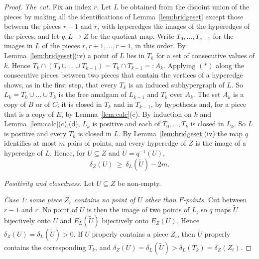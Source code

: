\documentclass[11pt,a4paper]{article}
\theoremstyle{definition}
\begin{document}
\begin{proof}
\emph{The cut.} Fix an index $r$. Let $L$ be obtained from the disjoint union
of the pieces by making all the identifications of Lemma~\ref{lem:bridgeset}
except those between the pieces $r-1$ and $r$, with hyperedges the images of
the hyperedges of the pieces, and let $q\colon L\to Z$ be the quotient map.
Write $T_0,\dots,T_{s-1}$ for the images in $L$ of the pieces
$r,r+1,\dots,r-1$, in this order. By Lemma~\ref{lem:bridgeset}(iv) a point of
$L$ lies in $T_k$ for a set of consecutive values of $k$. Hence
$T_k\cap(T_0\cup\dots\cup T_{k-1})=T_k\cap T_{k-1}=:A_k$. Applying $(\ast)$ along
the consecutive pieces between two pieces that contain the vertices of a
hyperedge shows, as in the first step, that every $T_k$ is an induced
subhypergraph of $L$. So $L_k=T_0\cup\dots\cup T_k$ is the free amalgam of
$L_{k-1}$ and $T_k$ over $A_k$. The set $A_k$ is a copy of $B$ or of $C$; it is closed in $T_k$ and in
$T_{k-1}$, by hypothesis and, for a piece that is a copy of $E$, by
Lemma~\ref{lem:calc}(c). By induction on $k$ and Lemma~\ref{lem:calc}(c),(d),
$L_k$ is positive and each of $T_0,\dots,T_k$ is closed in $L_k$. So $L$ is
positive and every $T_k$ is closed in $L$. By Lemma~\ref{lem:bridgeset}(iv) the
map $q$ identifies at most $m$ pairs of points, and every hyperedge of $Z$ is
the image of a hyperedge of $L$. Hence, for $U\subseteq Z$ and $\widetilde U=q^{-1}(U)$,
\begin{equation}\label{eq:cutloss}
 \delta_Z(U)\ \ge\ \delta_L(\widetilde U)-2m .
\end{equation}

\emph{Positivity and closedness.} Let $U\subseteq Z$ be non-empty.

\emph{Case 1: some piece $Z_r$ contains no point of $U$ other than
$F$-points.} Cut between $r-1$ and $r$. No point of $U$ is then the image of
two points of $L$, so $q$ maps $\widetilde U$ bijectively onto $U$ and
$E_L(\widetilde U)$ bijectively onto $E_Z(U)$. Hence
$\delta_Z(U)=\delta_L(\widetilde U)>0$. If $U$ properly contains a piece $Z_i$,
then $\widetilde U$ properly contains the corresponding $T_k$, and
$\delta_Z(U)=\delta_L(\widetilde U)>\delta_L(T_k)=\delta_Z(Z_i)$.


\end{proof}
\end{document}
